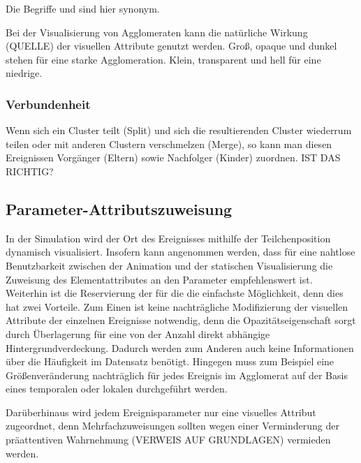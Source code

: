 Die Begriffe  und  sind hier synonym.

Bei der Visualisierung von Agglomeraten kann die natürliche Wirkung (QUELLE) der visuellen Attribute genutzt werden. Groß, opaque und dunkel stehen für eine starke Agglomeration. Klein, transparent und hell für eine niedrige.

\subsubsection{Verbundenheit}\label{sec:entwurf:verbundenheit}
Wenn sich ein Cluster teilt (Split) und sich die resultierenden Cluster wiederrum teilen oder mit anderen Clustern verschmelzen (Merge), so kann man diesen Ereignissen Vorgänger (Eltern) sowie Nachfolger (Kinder) zuordnen. IST DAS RICHTIG?



\subsection{Parameter-Attributszuweisung}\label{sec:entwurf:zuweisung:parameter-attribut}

In der  Simulation wird der Ort des Ereignisses mithilfe der Teilchenposition dynamisch visualisiert. Insofern kann angenommen werden, dass für eine nahtlose Benutzbarkeit zwischen der  Animation und der statischen Visualisierung die Zuweisung des Elementattributes  an den Parameter  empfehlenswert ist. Weiterhin ist die Reservierung der  für die  die einfachste Möglichkeit, denn dies hat zwei Vorteile. Zum Einen ist keine nachträgliche Modifizierung der visuellen Attribute der einzelnen Ereignisse notwendig, denn die Opazitätseigenschaft sorgt durch Überlagerung für eine von der Anzahl direkt abhängige Hintergrundverdeckung. Dadurch werden zum Anderen auch keine Informationen über die Häufigkeit im Datensatz benötigt. Hingegen muss zum Beispiel eine Größenveränderung nachträglich für jedes Ereignis im Agglomerat auf der Basis eines temporalen oder lokalen  durchgeführt werden.

Darüberhinaus wird jedem Ereignisparameter nur eine visuelles Attribut zugeordnet, denn Mehrfachzuweisungen sollten wegen einer Verminderung der präattentiven Wahrnehmung (VERWEIS AUF GRUNDLAGEN) vermieden werden.


